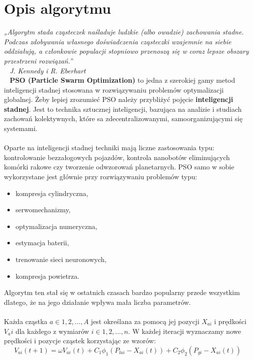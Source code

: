 \documentclass[a4paper,14pt,titlepage]{article}
\begin{document}
\section{Opis algorytmu}

\textit{„Algorytm stada cząsteczek naśladuje ludzkie (albo owadzie) zachowania stadne. Podczas zdobywania własnego doświadczenia cząsteczki wzajemnie na siebie oddziałują, a członkowie populacji stopniowo przenoszą się w coraz lepsze obszary przestrzeni rozwiązań.”}
\\\ \newline
\textit{J. Kennedy i R. Eberhart}
\\\ \newline
\textbf{PSO (Particle Swarm Optimization)} to jedna z szerokiej gamy metod inteligencji stadnej stosowana w rozwiązywaniu problemów optymalizacji globalnej. Żeby lepiej zrozumieć PSO należy przybliżyć pojęcie \textbf{inteligencji stadnej}. Jest to technika sztucznej inteligencji, bazująca na analizie i studiach
zachowań kolektywnych, które sa zdecentralizowanymi, samoorganizującymi się systemami. \\\\
Oparte na inteligencji stadnej techniki mają liczne zastosowania typu: kontrolowanie bezzałogowych pojazdów, kontrola nanobotów eliminujących komórki rakowe czy tworzenie odwzorowań planetarnych. PSO samo w sobie wykorzystane jest głównie przy rozwiązywaniu problemów typu:
\begin{itemize}
\item kompresja cylindryczna,
\item serwomechanizmy,
\item optymalizacja numeryczna,
\item estymacja baterii,
\item trenowanie sieci neuronowych,
\item kompresja powietrza.
\end{itemize}
Algorytm ten stał się w ostatnich czasach bardzo popularny przede wszystkim dlatego, że na jego działanie wpływa mała liczba parametrów.
\\\\
Każda cząstka $a\in1,2,...,A$ jest określana za pomocą jej pozycji $X_{ai}$ i prędkości $V_ai$ dla każdego z wymiarów $i\in1,2,...,n$.
W każdej iteracji wyznaczamy nowe prędkości i pozycje cząstek korzystając ze wzorów:
\begin{equation}
V_{ai}(t+1)=\omega V_{ai}(t)+C_1\phi_1(P_{lai}-X_{ai}(t))+C_2\phi_2(P_{gi}-X_{ai}(t))
\end{equation}
\end{document}
